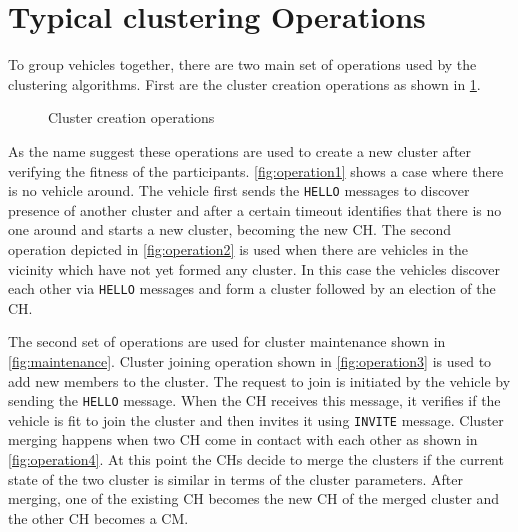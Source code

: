\documentclass[]{ccs-thesis}
\begin{document}
\section{Typical clustering Operations}

To group vehicles together, there are two main set of operations used by the clustering algorithms. First are the cluster creation operations
as shown in \cref{fig:creation}.

\begin{figure}
    \centering
    \vfill%

    \caption{Cluster creation operations}
    \label{fig:creation}
\end{figure}

As the name suggest these operations are used to create a new cluster after verifying the fitness of the
participants. \cref{fig:operation1} shows a case where there is no vehicle around. The vehicle first sends the \texttt{HELLO} messages to
discover presence of another cluster and after a certain timeout identifies that there is no one around and starts a new cluster, becoming the
new \ac{CH}. The second operation depicted in \cref{fig:operation2} is used when there are vehicles in the vicinity which have not yet formed
any cluster. In this case the vehicles discover each other via \texttt{HELLO} messages and form a cluster followed by an election of the
\ac{CH}.

The second set of operations are used for cluster maintenance shown in \cref{fig:maintenance}. Cluster joining operation shown in \cref{fig:operation3}
is used to add new members to the cluster. The request to join is initiated by the vehicle by sending the \texttt{HELLO} message. When the \ac{CH} receives
this message, it verifies if the vehicle is fit to join the cluster and then invites it using \texttt{INVITE} message. Cluster merging happens when two
\ac{CH} come in contact with each other as shown in \cref{fig:operation4}. At this point the \ac{CH}s decide to merge the clusters if the current state of
the two cluster is similar in terms of the cluster parameters. After merging, one of the existing \ac{CH} becomes the new \ac{CH} of the merged cluster and
the other \ac{CH} becomes a \ac{CM}.
\end{document}
